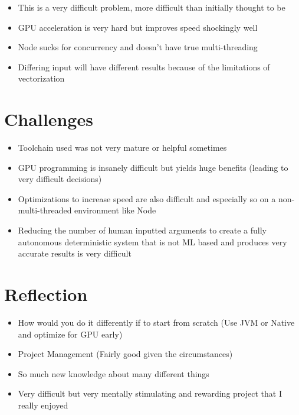 \documentclass[12pt]{article}
\begin{document}
    \begin{itemize}
        \item This is a very difficult problem, more difficult than initially thought to be
        \item GPU acceleration is very hard but improves speed shockingly well
        \item Node sucks for concurrency and doesn't have true multi-threading
        \item Differing input will have different results because of the limitations of vectorization
    \end{itemize}

    \pagebreak


    \section{Challenges}

    \begin{itemize}
        \item Toolchain used was not very mature or helpful sometimes
        \item GPU programming is insanely difficult but yields huge benefits (leading to very difficult decisions)
        \item Optimizations to increase speed are also difficult and especially so on a non-multi-threaded environment like Node
        \item Reducing the number of human inputted arguments to create a fully autonomous deterministic system that is not ML based and produces very accurate results is very difficult
    \end{itemize}

    \pagebreak


    \section{Reflection}

    \begin{itemize}
        \item How would you do it differently if to start from scratch (Use JVM or Native and optimize for GPU early)
        \item Project Management (Fairly good given the circumstances)
        \item So much new knowledge about many different things
        \item Very difficult but very mentally stimulating and rewarding project that I really enjoyed
    \end{itemize}
\end{document}
